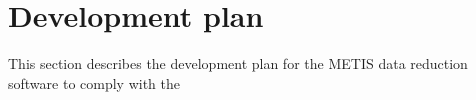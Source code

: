 \clearpage
\section{Development plan}\label{sec:development_plan}

This section describes the development plan for the METIS data reduction software to comply with the 